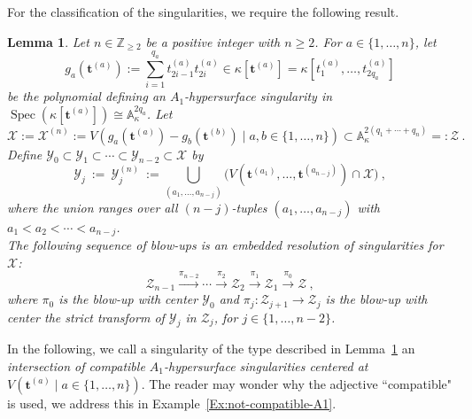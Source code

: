 \documentclass[letter,11pt]{amsart}
\renewcommand{\AA}{\ensuremath{\mathbb{A}}}
\newcommand{\ZZ}{\ensuremath{\mathbb{Z}}}
\DeclareMathOperator{\Spec}{Spec}
\renewcommand{\t}{\boldsymbol{t}}
\theoremstyle{theorem}
\newtheorem{lemma}[Thm]{Lemma}
\theoremstyle{definition}
\numberwithin{equation}{section}
\begin{document}
For the classification of the singularities, we require the following result.

\begin{lemma}
	\label{Lem:intersec_of_An}
	Let $ n \in \ZZ_{\geq 2} $ be a positive integer with $ n \geq 2 $. 
	For $ a \in \{ 1, \ldots, n \} $, let
	\[
		g_a (\t^{(a)}) := \sum_{i=1}^{q_a} t_{2i-1}^{(a)} t_{2i}^{(a)} \in \kappa [\t^{(a)}] = \kappa [t_1^{(a)}, \ldots, t_{2q_a}^{(a)}]
	\]
	be the polynomial defining an $ A_1 $-hypersurface singularity in $ \Spec (\kappa [\t^{(a)}]) \cong \AA_\kappa^{2q_a} $. 
	Let 
	\[
		\mathcal{X} :=  \mathcal{X}^{(n)} := V ( g_a (\t^{(a)}) - g_b (\t^{(b)}) \mid a, b \in \{ 1, \ldots, n\} )
		\subset \AA_\kappa^{2(q_1+ \cdots + q_n)} =: \mathcal{Z} 
		\ .
	\] 
	Define $ \mathcal{Y}_0 \subset  \mathcal{Y}_1 \subset  \cdots \subset \mathcal{Y}_{n-2} \subset \mathcal{X} $
	by
	\[
		\mathcal{Y}_j 
		\ := \
		\mathcal{Y}_j^{(n)} 
		\ := 
		\bigcup_{(a_1, \ldots, a_{n-j})}
		\Big( V(\t^{(a_1)}, \ldots, \t^{(a_{n-j})}) \cap \mathcal{X} \Big)  
		\ , 
	\]
	where the union ranges over all $ (n-j) $-tuples $ (a_1, \ldots, a_{n-j}) $
	with $ a_1 < a_2 < \cdots < a_{n-j} $. 
	\\
	The following sequence of blow-ups is an embedded resolution of singularities for $ \mathcal{X} $:
	\[
		\mathcal{Z}_{n-1} \stackrel{\pi_{n-2}}{\longrightarrow}
		\cdots 
		\stackrel{\pi_2}{\longrightarrow}
		\mathcal{Z}_2 \stackrel{\pi_1}{\longrightarrow}
		\mathcal{Z}_1 \stackrel{\pi_0}{\longrightarrow}
		\mathcal{Z}
		\ , 
	\]
	where $ \pi_0 $ is the blow-up with center $ \mathcal{Y}_0 $
	and $ \pi_j \colon \mathcal{Z}_{j+1} \to \mathcal{Z}_{j} $ is the blow-up with center the strict transform of $ \mathcal{Y}_j $ in $ \mathcal{Z}_{j} $, for $ j \in \{ 1, \ldots, n-2 \} $.
\end{lemma}

In the following, we call a singularity of the type described in Lemma~\ref{Lem:intersec_of_An} an 
{\em intersection of compatible $ A_1 $-hypersurface singularities centered at $ V (\t^{(a)} \mid a \in \{ 1, \ldots, n \}) $}.
The reader may wonder why the adjective ``compatible" is used, we address this in Example~\ref{Ex:not-compatible-A1}.
\end{document}
